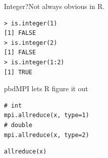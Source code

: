 \begin{frame}[fragile]
  \begin{block}{Integer?\qquad Not always obvious in R.}
    \vspace{-.2cm}
    \begin{lstlisting}
> is.integer(1)
[1] FALSE
> is.integer(2)
[1] FALSE
> is.integer(1:2)
[1] TRUE
    \end{lstlisting}
  \end{block}
  \begin{block}{pbdMPI lets R figure it out}\pause
    \begin{minipage}[t]{.475\textwidth}
      \begin{lstlisting}[title=Rmpi]
# int
mpi.allreduce(x, type=1)
# double
mpi.allreduce(x, type=2)
      \end{lstlisting}
    \end{minipage}
    \hfill
    \begin{minipage}[t]{.475\textwidth}
      \begin{lstlisting}[title=pbdMPI]
allreduce(x)
      \end{lstlisting}
    \end{minipage}
  \end{block}
\end{frame}


